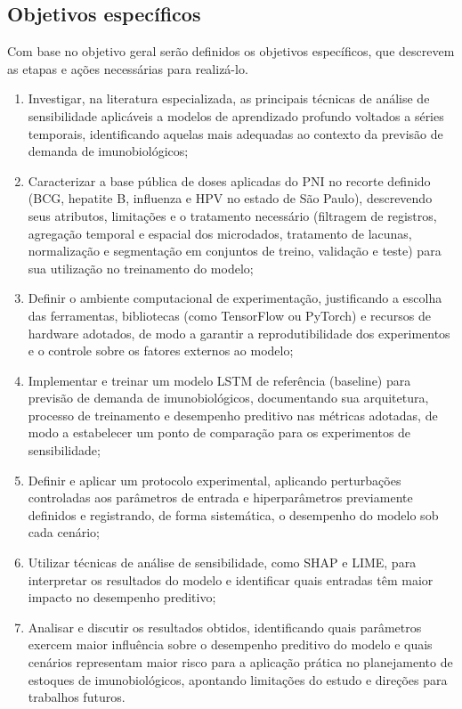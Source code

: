 \documentclass[
    12pt,
    openright,
    oneside,
    a4paper,
    english,
    brazil
]{abntex2}
\begin{document}
\subsection{Objetivos específicos}
\label{sec:objetivos_secundarios}

Com base no objetivo geral serão definidos os objetivos específicos, que descrevem as etapas e ações necessárias para realizá-lo.

\begin{enumerate}
    \item Investigar, na literatura especializada, as principais técnicas de análise de sensibilidade aplicáveis a modelos de aprendizado profundo voltados a séries temporais, identificando aquelas mais adequadas ao contexto da previsão de demanda de imunobiológicos;
    \item Caracterizar a base pública de doses aplicadas do PNI no recorte definido (BCG, hepatite B, influenza e HPV no estado de São Paulo), descrevendo seus atributos, limitações e o tratamento necessário (filtragem de registros, agregação temporal e espacial dos microdados, tratamento de lacunas, normalização e segmentação em conjuntos de treino, validação e teste) para sua utilização no treinamento do modelo;
    \item Definir o ambiente computacional de experimentação, justificando a escolha das ferramentas, bibliotecas (como TensorFlow ou PyTorch) e recursos de hardware adotados, de modo a garantir a reprodutibilidade dos experimentos e o controle sobre os fatores externos ao modelo;
    \item Implementar e treinar um modelo LSTM de referência (baseline) para previsão de demanda de imunobiológicos, documentando sua arquitetura, processo de treinamento e desempenho preditivo nas métricas adotadas, de modo a estabelecer um ponto de comparação para os experimentos de sensibilidade;
    \item Definir e aplicar um protocolo experimental, aplicando perturbações controladas aos parâmetros de entrada e hiperparâmetros previamente definidos e registrando, de forma sistemática, o desempenho do modelo sob cada cenário;
    \item Utilizar técnicas de análise de sensibilidade, como SHAP e LIME, para interpretar os resultados do modelo e identificar quais entradas têm maior impacto no desempenho preditivo;
    \item Analisar e discutir os resultados obtidos, identificando quais parâmetros exercem maior influência sobre o desempenho preditivo do modelo e quais cenários representam maior risco para a aplicação prática no planejamento de estoques de imunobiológicos, apontando limitações do estudo e direções para trabalhos futuros.
\end{enumerate}
\end{document}
